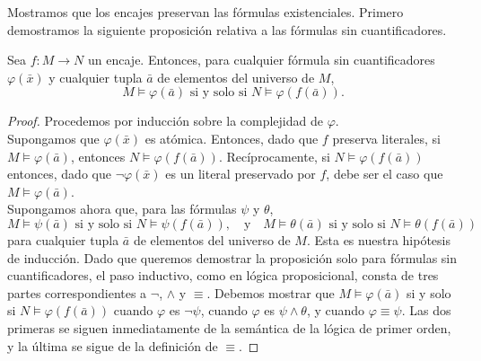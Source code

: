 \documentclass[12pt,a4paper]{book}
\begin{document}
    Mostramos que los encajes preservan las fórmulas existenciales. Primero demostramos la siguiente proposición relativa
    a las fórmulas sin cuantificadores.

    \begin{proposicion}\label{prop:encaje-preserva-sin-cuantificadores}
        Sea $f:M\rightarrow N$ un encaje. Entonces, para cualquier fórmula sin cuantificadores $\varphi(\bar{x})$ y
        cualquier tupla $\bar{a}$ de elementos del universo de $M$,
        \begin{equation*}
            M\models\varphi(\bar{a})\text{ si y solo si }N\models\varphi(f(\bar{a})).
        \end{equation*}
    \end{proposicion}
    \begin{proof}
        Procedemos por inducción sobre la complejidad de $\varphi$.\\
        Supongamos que $\varphi(\bar{x})$ es atómica. Entonces, dado que $f$ preserva literales, si $M\models\varphi(\bar{a})$,
        entonces $N\models\varphi(f(\bar{a}))$. Recíprocamente, si $N\models\varphi(f(\bar{a}))$ entonces, dado que
        $\neg\varphi(\bar{x})$ es un literal preservado por $f$, debe ser el caso que $M\models\varphi(\bar{a})$.\\
        Supongamos ahora que, para las fórmulas $\psi$ y $\theta$,
        \begin{equation*}
            M\models\psi(\bar{a})\text{ si y solo si }N\models\psi(f(\bar{a})),\quad\text{y}\quad
            M\models\theta(\bar{a})\text{ si y solo si }N\models\theta(f(\bar{a}))
        \end{equation*}
        para cualquier tupla $\bar{a}$ de elementos del universo de $M$. Esta es nuestra hipótesis de inducción. Dado que
        queremos demostrar la proposición solo para fórmulas sin cuantificadores, el paso inductivo, como en lógica
        proposicional, consta de tres partes correspondientes a $\neg$, $\wedge$ y $\equiv$. Debemos mostrar que
        $M\models\varphi(\bar{a})$ si y solo si $N\models\varphi(f(\bar{a}))$ cuando $\varphi$ es $\neg\psi$, cuando
        $\varphi$ es $\psi\wedge\theta$, y cuando $\varphi\equiv\psi$. Las dos primeras se siguen inmediatamente de la
        semántica de la lógica de primer orden, y la última se sigue de la definición de $\equiv$.
    \end{proof}
\end{document}
